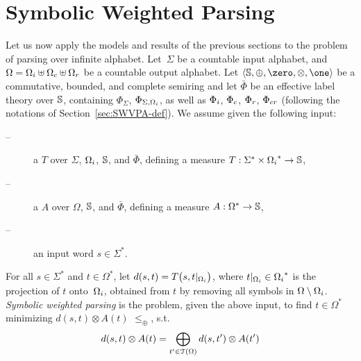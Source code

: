 \section{Symbolic Weighted Parsing}
\label{sec:parsing}

Let us now apply the models and results of the previous sections %
to the problem of parsing over infinite alphabet. %
%
%
Let~$\Sigma$ be a countable input alphabet, 
and~$\Omega = \Omegai \uplus \Omegac \uplus \Omegar$ be a countable output alphabet.
%
Let $\< \Semiring, \oplus, \zero, \otimes, \one>$ be a 
commutative, bounded, and complete  semiring  
and let $\bar\Phi$ be an effective label theory over $\mathbb{S}$,
containing $\Phi_\Sigma$, $\Phi_{\Sigma, \Omegai}$, as well as
$\Phii$, $\Phic$, $\Phir$, $\Phicr$
(following the notations of Section~\ref{sec:SWVPA-def}).
%
\noindent
We assume given the following input:
\begin{description}
\item[--] a \SWT $T$ over $\Sigma$, $\Omegai$, $\mathbb{S}$, and $\bar\Phi$, 
defining a measure %
$T: \Sigma^* \times \Omegai^* \to \Semiring$,

\item[--] a \SWVPA $A$ over $\Omega$, $\mathbb{S}$, and $\bar\Phi$,
defining a measure $A: \Omega^* \to \mathbb{S}$,
\item[--] an input word $s \in \Sigma^*$.
\end{description}
%
For all $s \in \Sigma^*$ and $t \in \Omega^*$, let 
\(d(s, t) = T\bigl(s, t|_\Omegai \bigr)\), 
where $t|_\Omegai \in \Omegai^*$ is the projection of $t$ onto~$\Omegai$,
obtained from $t$ by removing all symbols in $\Omega \setminus \Omegai$.
%
\noindent 
\emph{Symbolic weighted parsing} is the problem, 
given the above input, 
to find $t \in \Omega^*$ %
minimizing \( d(s, t) \otimes A(t)\)
\wrt $\leq_\oplus$, 
\ie s.t. %
%
\begin{equation}\label{eq:distance-lang}
d(s, t) \otimes A(t) = \displaystyle\bigoplus_{t' \in \mathcal{T}(\Omega)} d(s, t') \otimes A(t') 
\end{equation}
